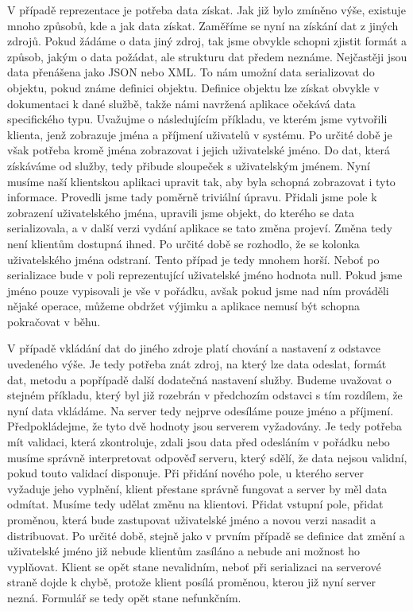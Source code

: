 V případě reprezentace je potřeba data získat. Jak již bylo zmíněno výše, existuje mnoho způsobů, kde a jak data získat. Zaměříme se nyní na získání dat z jiných zdrojů. Pokud žádáme o data jiný zdroj, tak jsme obvykle schopni zjistit formát a způsob, jakým o data požádat, ale strukturu dat předem neznáme. Nejčastěji jsou data přenášena jako JSON \cite{javaEE} nebo XML. To nám umožní data serializovat do objektu, pokud známe definici objektu. Definice objektu lze získat obvykle v dokumentaci k dané službě, takže námi navržená aplikace očekává data specifického typu. Uvažujme o následujícím příkladu, ve kterém jsme vytvořili klienta, jenž zobrazuje jména a příjmení uživatelů v systému. Po určité době je však potřeba kromě jména zobrazovat i jejich uživatelské jméno. Do dat, která získáváme od služby, tedy přibude sloupeček s uživatelským jménem. Nyní musíme naší klientskou aplikaci upravit tak, aby byla schopná zobrazovat i tyto informace. Provedli jsme tady poměrně triviální úpravu. Přidali jsme pole k zobrazení uživatelského jména, upravili jsme objekt, do kterého se data serializovala, a v další verzi vydání aplikace se tato změna projeví. Změna tedy není klientům dostupná ihned. Po určité době se rozhodlo, že se kolonka uživatelského jména odstraní. Tento případ je tedy mnohem horší. Neboť po serializace bude v poli reprezentující uživatelské jméno hodnota null. Pokud jsme jméno pouze vypisovali je vše v pořádku, avšak pokud jsme nad ním prováděli nějaké operace, můžeme obdržet výjimku a aplikace nemusí být schopna pokračovat v běhu.

V případě vkládání dat do jiného zdroje platí chování a nastavení z odstavce uvedeného výše. Je tedy potřeba znát zdroj, na který lze data odeslat, formát dat, metodu a popřípadě další dodatečná nastavení služby. Budeme uvažovat o stejném příkladu, který byl již rozebrán v předchozím odstavci s tím rozdílem, že nyní data vkládáme. Na server tedy nejprve odesíláme pouze jméno a příjmení. Předpokládejme, že tyto dvě hodnoty jsou serverem vyžadovány. Je tedy potřeba mít validaci, která zkontroluje, zdali jsou data před odesláním v pořádku nebo musíme správně interpretovat odpověď serveru, který sdělí, že data nejsou validní, pokud touto validací disponuje. Při přidání nového pole, u kterého server vyžaduje jeho vyplnění, klient přestane správně fungovat a server by měl data odmítat. Musíme tedy udělat změnu na klientovi. Přidat vstupní pole, přidat proměnou, která bude zastupovat uživatelské jméno a novou verzi nasadit a distribuovat. Po určité době, stejně jako v prvním případě se definice dat změní a uživatelské jméno již nebude klientům zasíláno a nebude ani možnost ho vyplňovat. Klient se opět stane nevalidním, neboť při serializaci na serverové straně dojde k chybě, protože klient posílá proměnou, kterou již nyní server nezná. Formulář se tedy opět stane nefunkčním.
